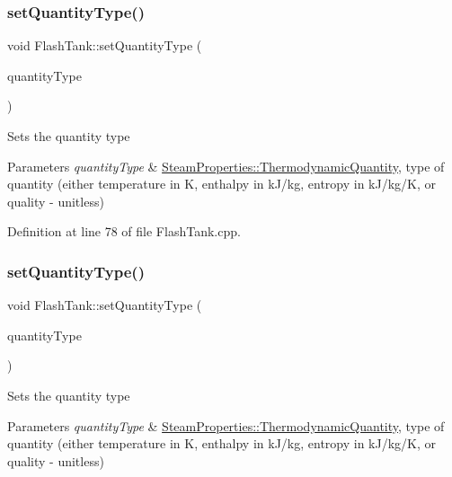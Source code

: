 \subsubsection{\texorpdfstring{set\+Quantity\+Type()}{setQuantityType()}\hspace{0.1cm}{\footnotesize\ttfamily [2/3]}}
{\footnotesize\ttfamily void Flash\+Tank\+::set\+Quantity\+Type (\begin{DoxyParamCaption}\item[{\hyperlink{class_steam_properties_ae0294bedf7d178c2d8fb6aed0f62fbff}{Steam\+Properties\+::\+Thermodynamic\+Quantity}}]{quantity\+Type }\end{DoxyParamCaption})}

Sets the quantity type 
\begin{DoxyParams}{Parameters}
{\em quantity\+Type} & \hyperlink{class_steam_properties_ae0294bedf7d178c2d8fb6aed0f62fbff}{Steam\+Properties\+::\+Thermodynamic\+Quantity}, type of quantity (either temperature in K, enthalpy in k\+J/kg, entropy in k\+J/kg/K, or quality -\/ unitless) \\
\hline
\end{DoxyParams}


Definition at line 78 of file Flash\+Tank.\+cpp.

\mbox{\label{class_flash_tank_a30aa7a42d1547f61b176da4a15e8e8ee}} 
\subsubsection{\texorpdfstring{set\+Quantity\+Type()}{setQuantityType()}\hspace{0.1cm}{\footnotesize\ttfamily [3/3]}}
{\footnotesize\ttfamily void Flash\+Tank\+::set\+Quantity\+Type (\begin{DoxyParamCaption}\item[{\hyperlink{class_steam_properties_ae0294bedf7d178c2d8fb6aed0f62fbff}{Steam\+Properties\+::\+Thermodynamic\+Quantity}}]{quantity\+Type }\end{DoxyParamCaption})}

Sets the quantity type 
\begin{DoxyParams}{Parameters}
{\em quantity\+Type} & \hyperlink{class_steam_properties_ae0294bedf7d178c2d8fb6aed0f62fbff}{Steam\+Properties\+::\+Thermodynamic\+Quantity}, type of quantity (either temperature in K, enthalpy in k\+J/kg, entropy in k\+J/kg/K, or quality -\/ unitless) \\
\hline
\end{DoxyParams}
\mbox{\label{class_flash_tank_ac7392743aeaf8de6ce368814ea42e236}} 
